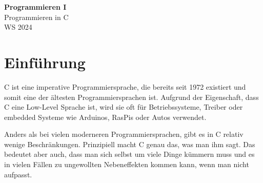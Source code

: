 \documentclass[11pt]{article}
\begin{document}
\thispagestyle{empty}

\newtheorem{anmk}{Anmerkung}[section]
\newtheorem{bsp}{Beispiel}[section]

\renewcommand{\figurename}{Fig.}

\newcommand{\ol}[1]{\begin{enumerate}#1\end{enumerate}}
\newcommand{\ul}[1]{\begin{itemize}#1\end{itemize}}
\newcommand{\li}[1]{\item{#1}}
\newcommand{\equivto}{\Longleftrightarrow}
\newcommand{\sube}{\subseteq}

\newcommand{\N}{\mathbb{N}}
\newcommand{\Z}{\mathbb{Z}}
\newcommand{\R}{\mathbb{R}}

\begin{center}
  {\LARGE \bf Programmieren I}\\
  {\Large Programmieren in C}\\
  WS 2024
\end{center}

\section{Einführung}
C ist eine imperative Programmiersprache, die bereits seit 1972 existiert und somit eine der ältesten Programmiersprachen ist.
Aufgrund der Eigenschaft, dass C eine Low-Level Sprache ist, wird sie oft für Betriebssysteme, Treiber oder embedded
Systeme wie Arduinos, RasPis oder Autos verwendet.

Anders als bei vielen moderneren Programmiersprachen, gibt es in C relativ wenige Beschränkungen. Prinzipiell macht C genau
das, was man ihm sagt. Das bedeutet aber auch, dass man sich selbst um viele Dinge kümmern muss und es in vielen Fällen
zu ungewollten Nebeneffekten kommen kann, wenn man nicht aufpasst.
\end{document}
